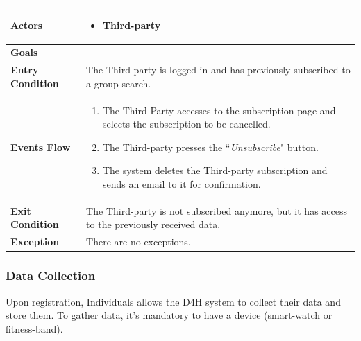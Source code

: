             \begin{table}[H]
            	\centering
                \begin{tabular}{|p{3cm}|p{8.2cm}|}
                    \hline
                    \textbf{Actors} &  \begin{itemize}
                        \item Third-party
                    \end{itemize} \\
                     \hline
                    \textbf{Goals} & \\ 
                     \hline
                    \textbf{Entry Condition} & The Third-party is logged in and has previously subscribed to a group search. \\
                     \hline
                    \textbf{Events Flow} & \begin{enumerate}
                        \item The Third-Party accesses to the subscription page and selects the subscription to be cancelled.
                        \item The Third-party presses the ``\emph{Unsubscribe}" button.
                        \item The system deletes the Third-party subscription and sends an email to it for confirmation.
                    \end{enumerate} \\
                     \hline
                    \textbf{Exit Condition} & The Third-party is not subscribed anymore, but it has access to the previously received data. \\
                     \hline
                    \textbf{Exception} & There are no exceptions. \\
                     \hline
                \end{tabular}  
            \end{table}        
        
        
        \subsubsection{Data Collection}
            
            Upon registration, Individuals allows the D4H system to collect their data and store them. To gather data, it's mandatory to have a device (smart-watch or fitness-band). 
            

